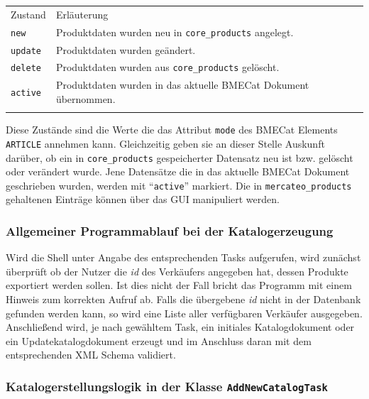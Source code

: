 \begin{table}[!htbp]
	\begin{tabularx}{\textwidth}{p{3cm} X}
	\rowcolor[HTML]{EFEFEF} 
	Zustand & Erläuterung \\ \cline{1-2} \addlinespace[7pt]
	\texttt{new} & Produktdaten wurden neu in \texttt{core\_products} angelegt. \\
	\texttt{update} & Produktdaten wurden geändert. \\
	\texttt{delete} & Produktdaten wurden aus \texttt{core\_products} gelöscht. \\
	\texttt{active} & Produktdaten wurden in das aktuelle BMECat Dokument übernommen. \\
	   \addlinespace[7pt] \cline{1-2} 
	\end{tabularx}%
		\end{table}	
	Diese Zustände sind die Werte die das Attribut \texttt{mode} des BMECat Elements \texttt{ARTICLE} annehmen kann. Gleichzeitig geben sie an dieser Stelle Auskunft darüber, ob ein in \texttt{core\_products} gespeicherter Datensatz neu ist bzw. gelöscht oder verändert wurde. Jene Datensätze die in das aktuelle BMECat Dokument geschrieben wurden, werden mit \enquote{\texttt{active}} markiert. Die in \texttt{mercateo\_products} gehaltenen Einträge können über das GUI manipuliert werden.
	
	\subsubsection{Allgemeiner Programmablauf bei der Katalogerzeugung}
	
	Wird die Shell unter Angabe des entsprechenden Tasks aufgerufen, wird zunächst überprüft ob der Nutzer die \textit{id} des Verkäufers angegeben hat, dessen Produkte exportiert werden sollen. Ist dies nicht der Fall bricht das Programm mit einem Hinweis zum korrekten Aufruf ab. Falls die übergebene \textit{id} nicht in der Datenbank gefunden werden kann, so wird eine Liste aller verfügbaren Verkäufer ausgegeben. Anschließend wird, je nach gewähltem Task, ein initiales Katalogdokument oder ein Updatekatalogdokument erzeugt und im Anschluss daran mit dem entsprechenden XML Schema validiert. 
	
	\subsubsection{Katalogerstellungslogik in der Klasse \texttt{AddNewCatalogTask}}
	

